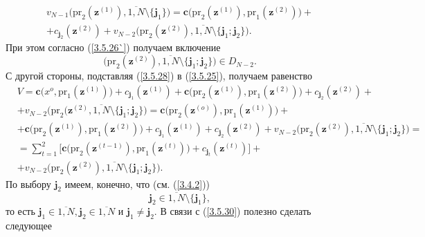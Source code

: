 \documentclass[11pt,twoside]{report}
\newcommand{\bfn}{\begin{equation}}
\newcommand{\efn}{\end{equation}}
\newcommand{\ov}{\overline}
\newcommand{\sm}{\setminus}
\begin{document}
{\begin{eqnarray}
&v_{N-1}\bigl(\mathrm{pr}_2(\mathbf{z}^{(1)}),\ov{1,N}\sm\{\mathbf{j}_1\}\bigl) =
\mathbf{c}\bigl(\mathrm{pr}_2(\mathbf{z}^{(1)}),\mathrm{pr}_1(\mathbf{z}^{(2)})) +
&\nonumber\\
&+c_{\mathbf{j}_2}(\mathbf{z}^{(2)}) + v_{N-2}\bigl(\mathrm{pr}_2(\mathbf{z}^{(2)}),
\ov{1,N}\sm\{\mathbf{j}_1;\mathbf{j}_2\}\bigl).
\label{3.5.28}
\end{eqnarray}
При этом согласно (\ref{3.5.26`}) получаем включение
\bfn\label{3.5.28}
\bigl(\mathrm{pr}_2(\mathbf{z}^{(2)}),\ov{1,N}\sm\{\mathbf{j}_1;\mathbf{j}_2\}\bigl)\in D_{N-2}.
\efn
С другой стороны, подставляя  (\ref{3.5.28}) в (\ref{3.5.25}), получаем равенство
\begin{eqnarray}
&V = \mathbf{c}\bigl(x^o,\mathrm{pr}_1(\mathbf{z}^{(1)})\bigl) +
c_{\mathbf{j}_1}(\mathbf{z}^{(1)}) + \mathbf{c}\bigl(\mathrm{pr}_2(\mathbf{z}^{(1)}),
\mathrm{pr}_1(\mathbf{z}^{(2)})\bigl) + c_{\mathbf{j}_2}(\mathbf{z}^{(2)}) +
&\nonumber\\
&+v_{N-2}\bigl(\mathrm{pr}_2(\mathbf{z}^{(2)},\ov{1,N}\sm\{\mathbf{j}_1;\mathbf{j}_2\}\bigl) =
\mathbf{c}\bigl(\mathrm{pr}_2(\mathbf{z}^{(o)}),\mathrm{pr}_1(\mathbf{z}^{(1)})\bigl) +
&\nonumber\\
&+ \mathbf{c}\bigl(\mathrm{pr}_2(\mathbf{z}^{(1)}),\mathrm{pr}_1(\mathbf{z}^{(2)})\bigl) +
c_{\mathbf{j}_1}(\mathbf{z}^{(1)}) + c_{\mathbf{j}_2}(\mathbf{z}^{(2)}) +
v_{N-2}\bigl(\mathrm{pr}_2(\mathbf{z}^{(2)}),\ov{1,N}\sm\{\mathbf{j}_1;\mathbf{j}_2\}\bigl) =
&\nonumber\\
&= \sum\limits_{t=1}^2 \bigl[\mathbf{c}\bigl(\mathrm{pr}_2(\mathbf{z}^{(t-1)}),
\mathrm{pr}_1(\mathbf{z}^{(t)})\bigl) + c_{\mathbf{j}_t}(\mathbf{z}^{(t)})\bigl] +
&\nonumber\\
&+v_{N-2}\bigl(\mathrm{pr}_2(\mathbf{z}^{(2)}),\ov{1,N}\sm\{\mathbf{j}_1;\mathbf{j}_2\}\bigl).
&\label{3.5.30}
\end{eqnarray}
По выбору $\mathbf{j}_2$ имеем, конечно, что (см. (\ref{3.4.2}))
\bfn\label{3.5.31`}\mathbf{j}_2 \in \ov{1,N}\sm\{\mathbf{j}_1\},
\efn
то есть $\mathbf{j}_1\in \ov{1,N}, \mathbf{j}_2\in \ov{1,N}$ и $\mathbf{j}_1 \neq
\mathbf{j}_2.$ В связи с (\ref{3.5.30}) полезно сделать следующее

}
\end{document}
